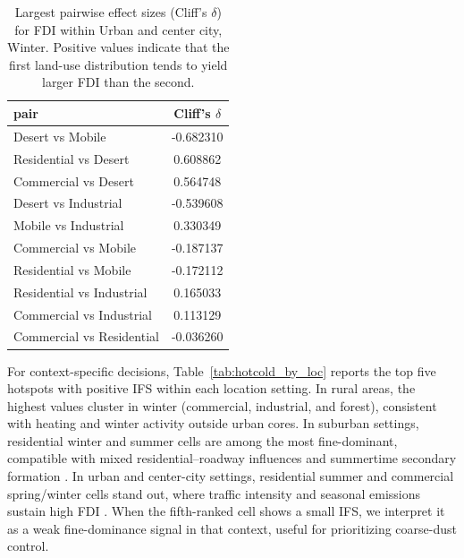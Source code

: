 \documentclass[a4paper,fleqn]{cas-sc}
\begin{document}
\begin{table}[htb]
\centering
\caption{Largest pairwise effect sizes (Cliff’s $\delta$) for FDI within Urban and center city, Winter. Positive values indicate that the first land-use distribution tends to yield larger FDI than the second.}
\label{tab:effects_example}
\begin{tabular}{lc}
\hline
\textbf{pair} & \textbf{Cliff’s $\delta$} \\
\hline
Desert vs Mobile & -0.682310 \\
Residential vs Desert & 0.608862 \\
Commercial vs Desert & 0.564748 \\
Desert vs Industrial & -0.539608 \\
Mobile vs Industrial & 0.330349 \\
Commercial vs Mobile & -0.187137 \\
Residential vs Mobile & -0.172112 \\
Residential vs Industrial & 0.165033 \\
Commercial vs Industrial & 0.113129 \\
Commercial vs Residential & -0.036260 \\
\hline
\end{tabular}
\end{table}

For context-specific decisions, Table~\ref{tab:hotcold_by_loc} reports the top five hotspots with positive IFS within each location setting. In rural areas, the highest values cluster in winter (commercial, industrial, and forest), consistent with heating and winter activity outside urban cores. In suburban settings, residential winter and summer cells are among the most fine-dominant, compatible with mixed residential--roadway influences and summertime secondary formation \citep{Bell2007, Clements2016}. In urban and center-city settings, residential summer and commercial spring/winter cells stand out, where traffic intensity and seasonal emissions sustain high FDI \citep{Cummings2021}. When the fifth-ranked cell shows a small IFS, we interpret it as a weak fine-dominance signal in that context, useful for prioritizing coarse-dust control.
\end{document}
